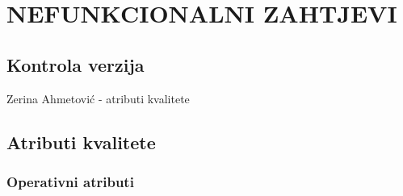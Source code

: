 \sloppy
\chapter{NEFUNKCIONALNI ZAHTJEVI}

\sloppy
\section*{Kontrola verzija}

Zerina Ahmetović - atributi kvalitete

\sloppy
\section{Atributi kvalitete}
\sloppy
\subsection{Operativni atributi}

